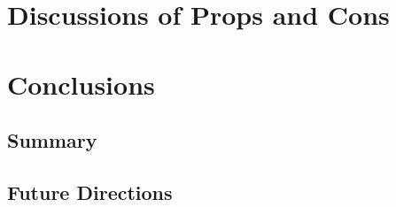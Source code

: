 \section{Discussions of Props and Cons}
\lipsum

\section{Conclusions}

	\subsection{Summary}
	\lipsum[1]

	\subsection{Future Directions}
	\lipsum[1]